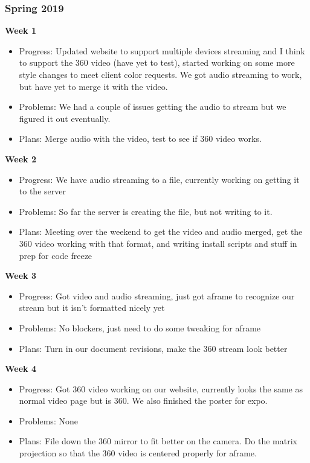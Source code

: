     \subsubsection{Spring 2019}
        \textbf{Week 1}
        \begin{itemize}
            \item Progress: Updated website to support multiple devices streaming and I think to support the 360 video (have yet to test), started working on some more style changes to meet client color requests. We got audio streaming to work, but have yet to merge it with the video.
            \item Problems: We had a couple of issues getting the audio to stream but we figured it out eventually.
            \item Plans: Merge audio with the video, test to see if 360 video works.
        \end{itemize}
        \textbf{Week 2}
        \begin{itemize}
            \item Progress: We have audio streaming to a file, currently working on getting it to the server
            \item Problems: So far the server is creating the file, but not writing to it.
            \item Plans: Meeting over the weekend to get the video and audio merged, get the 360 video working with that format, and writing install scripts and stuff in prep for code freeze
        \end{itemize}
        \textbf{Week 3}
        \begin{itemize}
            \item Progress: Got video and audio streaming, just got aframe to recognize our stream but it isn't formatted nicely yet

            \item Problems: No blockers, just need to do some tweaking for aframe

            \item Plans: Turn in our document revisions, make the 360 stream look better
        \end{itemize}
        \textbf{Week 4}
        \begin{itemize}
            \item Progress: Got 360 video working on our website, currently looks the same as normal video page but is 360. We also finished the poster for expo.

            \item Problems: None

            \item Plans: File down the 360 mirror to fit better on the camera. Do the matrix projection so that the 360 video is centered properly for aframe.
        \end{itemize}
